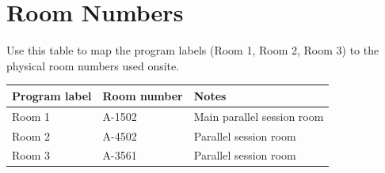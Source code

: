 \section*{Room Numbers}

Use this table to map the program labels (Room 1, Room 2, Room 3) to the physical room numbers used onsite.

\begin{center}
\begin{tabular}{p{} p{} p{}}
\toprule
Program label & Room number & Notes \\
\midrule
Room 1 & A-1502 & Main parallel session room \\
Room 2 & A-4502 & Parallel session room \\
Room 3 & A-3561 & Parallel session room \\
\bottomrule
\end{tabular}
\end{center}